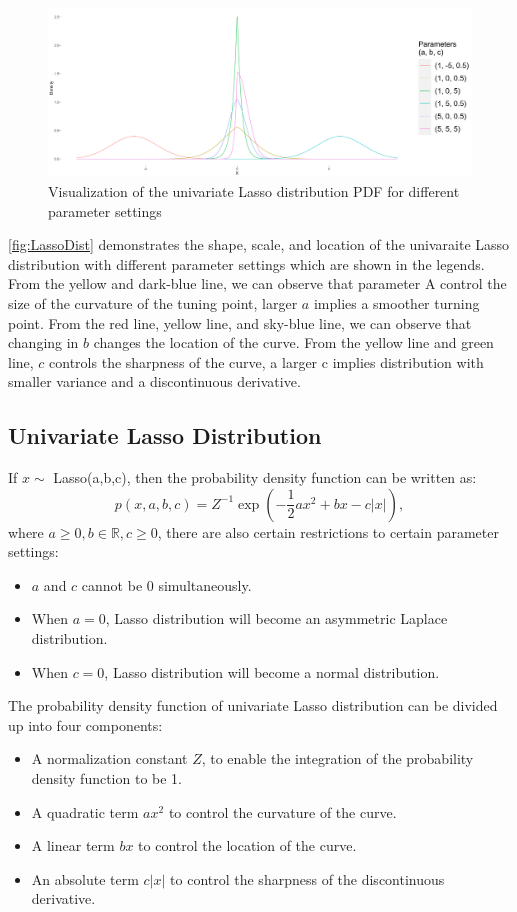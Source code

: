 \begin{figure}[h]
	\includegraphics[width=\linewidth]{Lasso_distribution}
	\caption{Visualization of the univariate Lasso distribution PDF for different parameter settings}
	\label{fig:LassoDist}
\end{figure}
\autoref{fig:LassoDist} demonstrates the shape, scale, and location of the univaraite Lasso distribution with different parameter settings which are shown in the legends.
From the yellow and dark-blue line, we can observe that parameter A control the size of the curvature of the tuning point, larger $a$ implies a smoother turning point.
From the red line, yellow line, and sky-blue line, we can observe that changing in $b$ changes the location of the curve.
From the yellow line and green line, $c$ controls the sharpness of the curve, a larger c implies distribution with smaller variance and a discontinuous derivative.


\subsection{Univariate Lasso Distribution}
If $x \sim $ Lasso(a,b,c), then the probability density function can be written as:
\begin{equation}
	p(x,a,b,c) = Z^{-1}\exp\left(-\frac{1}{2}ax^2+bx-c|x|\right),
\end{equation}
where $a \geq 0, b \in \mathbb{R}, c \geq 0$, there are also certain restrictions to certain parameter settings:
\begin{itemize}
	\item $a$ and $c$ cannot be 0 simultaneously.
	\item When $a = 0$, Lasso distribution will become an asymmetric Laplace distribution.
	\item When $c = 0$, Lasso distribution will become a normal distribution.
\end{itemize}
The probability density function of univariate Lasso distribution can be divided up into four components:
\begin{itemize}
	\item A normalization constant $Z$, to enable the integration of the probability density function to be 1.
	\item A quadratic term $ax^2$ to control the curvature of the curve.
	\item A linear term $bx$ to control the location of the curve.
	\item An absolute term $c|x|$ to control the sharpness of the discontinuous derivative.
\end{itemize} 

